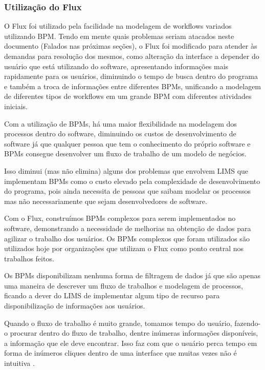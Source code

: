 
\subsubsection{Utilização do Flux}

O Flux foi utilizado pela facilidade na modelagem de workflows variados utilizando BPM. Tendo em mente quais problemas seriam atacados neste documento (Falados nas próximas seções), o Flux foi modificado para atender às demandas para resolução dos mesmos, como alteração da interface a depender do usuário que está utilizando do software, apresentando informações mais rapidamente para os usuários, diminuindo o tempo de busca dentro do programa e também a troca de informações entre diferentes BPMs, unificando a modelagem de diferentes tipos de workflows em um grande BPM com diferentes atividades iniciais.


Com a utilização de BPMs, há uma maior flexibilidade na modelagem dos processos dentro do software, diminuindo os custos de desenvolvimento de software já que qualquer pessoa que tem o conhecimento do próprio software e BPMs consegue desenvolver um fluxo de trabalho de um modelo de negócios.

Isso diminui (mas não elimina) alguns dos problemas que envolvem LIMS que implementam BPMs como o custo elevado pela complexidade de desenvolvimento do programa, pois ainda necessita de pessoas que saibam modelar os processos mas não necessariamente que sejam desenvolvedores de software.


Com o Flux, construímos BPMs complexos para serem implementados no software, demonstrando a necessidade de melhorias na obtenção de dados para agilizar o trabalho dos usuários. Os BPMs complexos que foram utilizados são utilizados hoje por organizações que utilizam o Flux como ponto central nos trabalhos feitos.

Os BPMs disponibilizam nenhuma forma de filtragem de dados já que são apenas uma maneira de descrever um fluxo de trabalhos e modelagem de processos, ficando a dever do LIMS de implementar algum tipo de recurso para disponibilização de informações aos usuários.

Quando o fluxo de trabalho é muito grande, tomamos tempo do usuário, fazendo-o procurar dentro do fluxo de trabalho, dentre inúmeras informações disponíveis, a informação que ele deve encontrar. Isso faz com que o usuário perca tempo em forma de inúmeros cliques dentro de uma interface que muitas vezes não é intuitiva \R.

